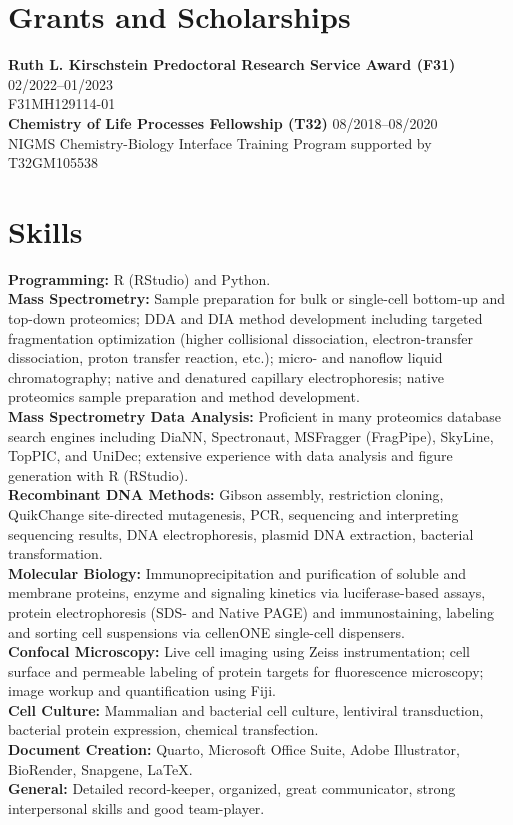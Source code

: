 \documentclass[10pt, letterpaper]{article}
\begin{document}
\section{Grants and Scholarships}

\textbf{Ruth L. Kirschstein Predoctoral Research Service Award (F31)} \hfill 02/2022--01/2023 \\
F31MH129114-01 \\[4pt]

\textbf{Chemistry of Life Processes Fellowship (T32)} \hfill 08/2018--08/2020 \\
NIGMS Chemistry-Biology Interface Training Program supported by T32GM105538

\section{Skills}

\textbf{Programming:} R (RStudio) and Python. \\[3pt]
\textbf{Mass Spectrometry:} Sample preparation for bulk or single-cell bottom-up and top-down proteomics;
DDA and DIA method development including targeted fragmentation optimization (higher collisional
dissociation, electron-transfer dissociation, proton transfer reaction, etc.); micro- and nanoflow liquid
chromatography; native and denatured capillary electrophoresis; native proteomics sample preparation and
method development. \\[3pt]
\textbf{Mass Spectrometry Data Analysis:} Proficient in many proteomics database search engines including DiaNN, Spectronaut, MSFragger (FragPipe), SkyLine, TopPIC,
and UniDec; extensive experience with data analysis and figure generation with R (RStudio). \\[3pt]
\textbf{Recombinant DNA Methods:} Gibson assembly, restriction cloning, QuikChange site-directed
mutagenesis, PCR, sequencing and interpreting sequencing results, DNA electrophoresis, plasmid DNA
extraction, bacterial transformation. \\[3pt]
\textbf{Molecular Biology:} Immunoprecipitation and purification of soluble and membrane proteins,
enzyme and signaling kinetics via luciferase-based assays, protein electrophoresis (SDS- and Native PAGE)
and immunostaining, labeling and sorting cell suspensions via cellenONE single-cell dispensers. \\[3pt]
\textbf{Confocal Microscopy:} Live cell imaging using Zeiss instrumentation; cell surface and permeable
labeling of protein targets for fluorescence microscopy; image workup and quantification using Fiji. \\[3pt]
\textbf{Cell Culture:} Mammalian and bacterial cell culture, lentiviral transduction, bacterial protein
expression, chemical transfection. \\[3pt]
\textbf{Document Creation:} Quarto, Microsoft Office Suite, Adobe Illustrator, BioRender, Snapgene,
\LaTeX{}. \\[3pt]
\textbf{General:} Detailed record-keeper, organized, great communicator, strong interpersonal skills and good team-player. 
\end{document}
